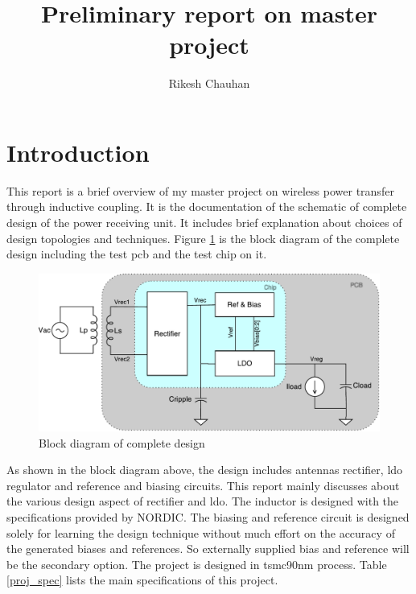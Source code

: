 \documentclass[12pt,a4paper,UKenglish]{article}
\title{Preliminary report on master project}
\author{Rikesh Chauhan}
\date{}
\begin{document}
\maketitle

\section{Introduction}
This report is a brief overview of my master project on wireless power transfer through inductive coupling. It is the documentation of the schematic of complete design of the power receiving unit. It includes brief explanation about choices of design topologies and techniques. Figure \ref{fig:blockd} is the block diagram of the complete design including the test \acrshort{pcb} and the test chip on it.

\begin{figure}[!htbp] %
   \centering
   \includegraphics[width=\textwidth]{img/block_diagram.pdf}
   \caption{Block diagram of complete design}
   \label{fig:blockd}
\end{figure}

As shown in the block diagram above, the design includes antennas rectifier, \acrshort{ldo} regulator and reference and biasing circuits. This report mainly discusses about the various design aspect of rectifier and \acrshort{ldo}. The inductor is designed with the specifications provided by NORDIC. The biasing and reference circuit is designed solely for learning the design technique without much effort on the accuracy of the generated biases and references. So externally supplied bias and reference will be the secondary option. The project is designed in tsmc90nm process. Table \ref{proj_spec} lists the main specifications of this project.  \\ 
\end{document}
